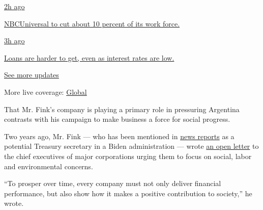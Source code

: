 \href{https://www.nytimes3xbfgragh.onion/live/2020/08/04/business/stock-market-today-coronavirus?action=click\&pgtype=Article\&state=default\&region=MAIN_CONTENT_1\&context=storylines_live_updates\#nbcuniversal-to-cut-about-10-percent-of-its-work-force}{2h
ago}

\href{https://www.nytimes3xbfgragh.onion/live/2020/08/04/business/stock-market-today-coronavirus?action=click\&pgtype=Article\&state=default\&region=MAIN_CONTENT_1\&context=storylines_live_updates\#nbcuniversal-to-cut-about-10-percent-of-its-work-force}{NBCUniversal
to cut about 10 percent of its work force.}

\href{https://www.nytimes3xbfgragh.onion/live/2020/08/04/business/stock-market-today-coronavirus?action=click\&pgtype=Article\&state=default\&region=MAIN_CONTENT_1\&context=storylines_live_updates\#loans-are-harder-to-get-even-as-interest-rates-are-low}{3h
ago}

\href{https://www.nytimes3xbfgragh.onion/live/2020/08/04/business/stock-market-today-coronavirus?action=click\&pgtype=Article\&state=default\&region=MAIN_CONTENT_1\&context=storylines_live_updates\#loans-are-harder-to-get-even-as-interest-rates-are-low}{Loans
are harder to get, even as interest rates are low.}

\href{https://www.nytimes3xbfgragh.onion/live/2020/08/04/business/stock-market-today-coronavirus?action=click\&pgtype=Article\&state=default\&region=MAIN_CONTENT_1\&context=storylines_live_updates}{See
more updates}

More live coverage:
\href{https://www.nytimes3xbfgragh.onion/2020/08/04/world/coronavirus-cases.html?action=click\&pgtype=Article\&state=default\&region=MAIN_CONTENT_1\&context=storylines_live_updates}{Global}

That Mr. Fink's company is playing a primary role in pressuring
Argentina contrasts with his campaign to make business a force for
social progress.

Two years ago, Mr. Fink --- who has been mentioned in
\href{https://www.cnbc.com/2020/04/06/biden-donors-float-elizabeth-warren-larry-fink-others-for-key-roles.html}{news
reports} as a potential Treasury secretary in a Biden administration ---
wrote
\href{http://www.corporance.es/wp-content/uploads/2018/01/Larry-Fink-letter-to-CEOs-2018-1.pdf}{an
open letter} to the chief executives of major corporations urging them
to focus on social, labor and environmental concerns.

``To prosper over time, every company must not only deliver financial
performance, but also show how it makes a positive contribution to
society,'' he wrote.

